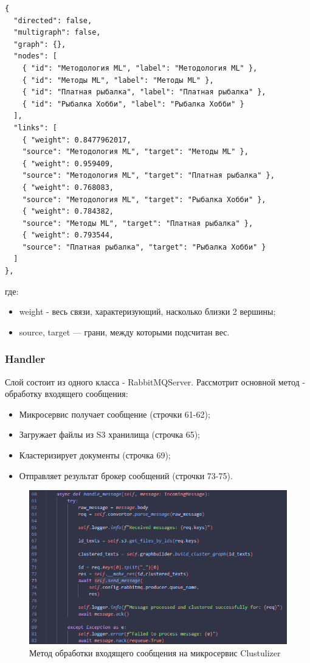 \begin{itemize}
\begin{Verbatim}[fontsize=\small]
{
  "directed": false,
  "multigraph": false,
  "graph": {},
  "nodes": [
    { "id": "Методология ML", "label": "Методология ML" },
    { "id": "Методы ML", "label": "Методы ML" },
    { "id": "Платная рыбалка", "label": "Платная рыбалка" },
    { "id": "Рыбалка Хобби", "label": "Рыбалка Хобби" }
  ],
  "links": [
    { "weight": 0.8477962017, 
    "source": "Методология ML", "target": "Методы ML" },
    { "weight": 0.959409, 
    "source": "Методология ML", "target": "Платная рыбалка" },
    { "weight": 0.768083, 
    "source": "Методология ML", "target": "Рыбалка Хобби" },
    { "weight": 0.784382, 
    "source": "Методы ML", "target": "Платная рыбалка" },
    { "weight": 0.793544,
    "source": "Платная рыбалка", "target": "Рыбалка Хобби" }
  ]
},
\end{Verbatim}
где:
  \begin{itemize}
        \item weight - весь связи, характеризующий, насколько близки 2 вершины;
        \item source, target —  грани, между которыми подсчитан вес.
    \end{itemize}
  

\subsubsection{Handler}
Слой состоит из одного класса  -  RabbitMQServer. Рассмотрит основной метод - обработку входящего сообщения:
 \begin{itemize}
 \item  Микросервис получает сообщение (строчки 61-62);
 \item  Загружает файлы из S3 хранилища (строчка 65);
 \item  Кластеризирует документы  (строчка 69);
 \item  Отправляет результат брокер сообщений   (строчки 73-75).

\end{itemize}

\begin{figure}[H]
    \centering
    \includegraphics[width=1\textwidth]{styles/diploma/inc/clustulizer_handler1.png} 
    \caption{Метод обработки входящего сообщения на микросервис Clustulizer}
    \label{fig:example}
\end{figure}


\end{itemize}
